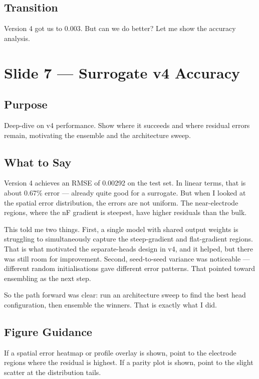 \documentclass[12pt,a4paper]{article}
\begin{document}
\subsection*{Transition}
Version 4 got us to 0.003. But can we do better? Let me show the
accuracy analysis.

\clearpage

\section{Slide 7 --- Surrogate v4 Accuracy}
\label{sec:slide7}

\subsection*{Purpose}
Deep-dive on v4 performance. Show where it succeeds and where
residual errors remain, motivating the ensemble and the architecture
sweep.

\subsection*{What to Say}

Version 4 achieves an RMSE of 0.00292 on the test set. In linear
terms, that is about 0.67\% error --- already quite good for a
surrogate. But when I looked at the spatial error distribution, the
errors are not uniform. The near-electrode regions, where the nF
gradient is steepest, have higher residuals than the bulk.

This told me two things. First, a single model with shared output
weights is struggling to simultaneously capture the steep-gradient
and flat-gradient regions. That is what motivated the separate-heads
design in v4, and it helped, but there was still room for improvement.
Second, seed-to-seed variance was noticeable --- different random
initialisations gave different error patterns. That pointed toward
ensembling as the next step.

So the path forward was clear: run an architecture sweep to find the
best head configuration, then ensemble the winners. That is exactly
what I did.

\subsection*{Figure Guidance}
If a spatial error heatmap or profile overlay is shown, point to the
electrode regions where the residual is highest. If a parity plot is
shown, point to the slight scatter at the distribution tails.
\end{document}
